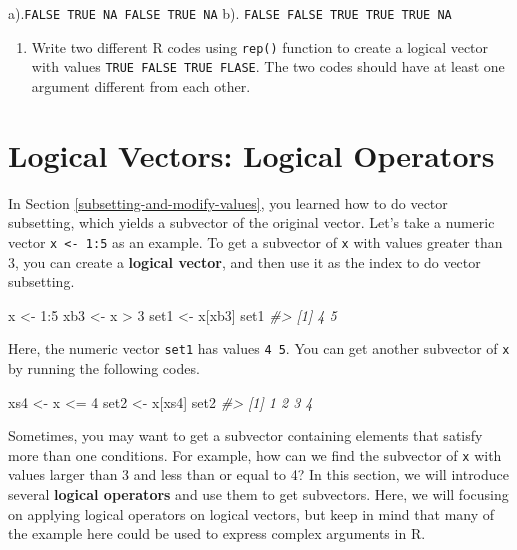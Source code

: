 \documentclass[
]{book}
\newenvironment{Shaded}{\begin{snugshade}}{\end{snugshade}}
\newcommand{\CommentTok}[1]{\textcolor[rgb]{0.56,0.35,0.01}{\textit{#1}}}
\newcommand{\DecValTok}[1]{\textcolor[rgb]{0.00,0.00,0.81}{#1}}
\newcommand{\NormalTok}[1]{#1}
\newcommand{\OtherTok}[1]{\textcolor[rgb]{0.56,0.35,0.01}{#1}}
\newcommand{\SpecialCharTok}[1]{\textcolor[rgb]{0.00,0.00,0.00}{#1}}
\providecommand{\tightlist}{%
  \setlength{\itemsep}{0pt}\setlength{\parskip}{0pt}}
\begin{document}
a).\texttt{FALSE\ TRUE\ NA\ FALSE\ TRUE\ NA}
b). \texttt{FALSE\ FALSE\ TRUE\ TRUE\ TRUE\ NA}

\begin{enumerate}
\def\labelenumi{\arabic{enumi}.}
\setcounter{enumi}{1}
\tightlist
\item
  Write two different R codes using \texttt{rep()} function to create a logical vector with values \texttt{TRUE\ FALSE\ TRUE\ FLASE}. The two codes should have at least one argument different from each other.
\end{enumerate}

\hypertarget{logical_operators}{%
\section{Logical Vectors: Logical Operators}\label{logical_operators}}

In Section \ref{subsetting-and-modify-values}, you learned how to do vector subsetting, which yields a subvector of the original vector. Let's take a numeric vector \texttt{x\ \textless{}-\ 1:5} as an example. To get a subvector of \texttt{x} with values greater than 3, you can create a \textbf{logical vector}, and then use it as the index to do vector subsetting.

\begin{Shaded}
\begin{Highlighting}[]
\NormalTok{x }\OtherTok{\textless{}{-}} \DecValTok{1}\SpecialCharTok{:}\DecValTok{5}
\NormalTok{xb3 }\OtherTok{\textless{}{-}}\NormalTok{ x }\SpecialCharTok{\textgreater{}} \DecValTok{3}
\NormalTok{set1 }\OtherTok{\textless{}{-}}\NormalTok{ x[xb3]}
\NormalTok{set1}
\CommentTok{\#\textgreater{} [1] 4 5}
\end{Highlighting}
\end{Shaded}

Here, the numeric vector \texttt{set1} has values \texttt{4\ 5}. You can get another subvector of \texttt{x} by running the following codes.

\begin{Shaded}
\begin{Highlighting}[]
\NormalTok{xs4 }\OtherTok{\textless{}{-}}\NormalTok{ x }\SpecialCharTok{\textless{}=} \DecValTok{4}
\NormalTok{set2 }\OtherTok{\textless{}{-}}\NormalTok{ x[xs4]}
\NormalTok{set2}
\CommentTok{\#\textgreater{} [1] 1 2 3 4}
\end{Highlighting}
\end{Shaded}

Sometimes, you may want to get a subvector containing elements that satisfy more than one conditions. For example, how can we find the subvector of \texttt{x} with values larger than 3 and less than or equal to 4? In this section, we will introduce several \textbf{logical operators} and use them to get subvectors. Here, we will focusing on applying logical operators on logical vectors, but keep in mind that many of the example here could be used to express complex arguments in R.
\end{document}
